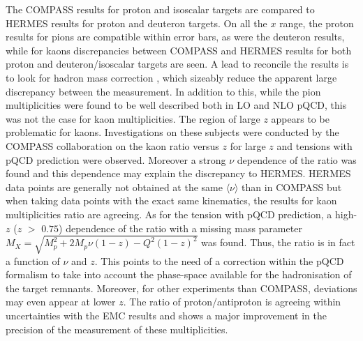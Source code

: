 The COMPASS results for proton and isoscalar targets are compared to HERMES results for proton and deuteron targets. On all the $x$ range, the proton results for pions are compatible within error bars, as were the deuteron results, while for kaons discrepancies between COMPASS and HERMES results for both proton and deuteron/isoscalar targets are seen. A lead to reconcile the results is to look for hadron mass correction \cite{Accardi}, which sizeably reduce the apparent large discrepancy between the measurement. In addition to this, while the pion multiplicities were found to be well described both in LO and NLO pQCD, this was not the case for kaon multiplicities. The region of large $z$ appears to be problematic for kaons. Investigations on these subjects were conducted by the COMPASS collaboration on the kaon ratio versus $z$ for large $z$ \cite{MarcinPubli} and tensions with pQCD prediction were observed. Moreover a strong $\nu$ dependence of the ratio was found and this dependence may explain the discrepancy to HERMES. HERMES data points are generally not obtained at the same $\langle \nu \rangle$ than in COMPASS but when taking data points with the exact same kinematics, the results for kaon multiplicities ratio are agreeing. As for the tension with pQCD prediction, a high-$z$ ($z$ $>$ $0.75$) dependence of the ratio with a missing mass parameter $M_X = \sqrt{M^2_p + 2M_p \nu (1-z) - Q^2 (1-z)^2}$ was found. Thus, the ratio is in fact a function of $\nu$ and $z$. This points to the need of a correction within the pQCD formalism to take into account the phase-space available for the hadronisation of the target remnants. Moreover, for other experiments than COMPASS, deviations may even appear at lower $z$. The ratio of proton/antiproton is agreeing within uncertainties with the EMC results and shows a major improvement in the precision of the measurement of these multiplicities.


